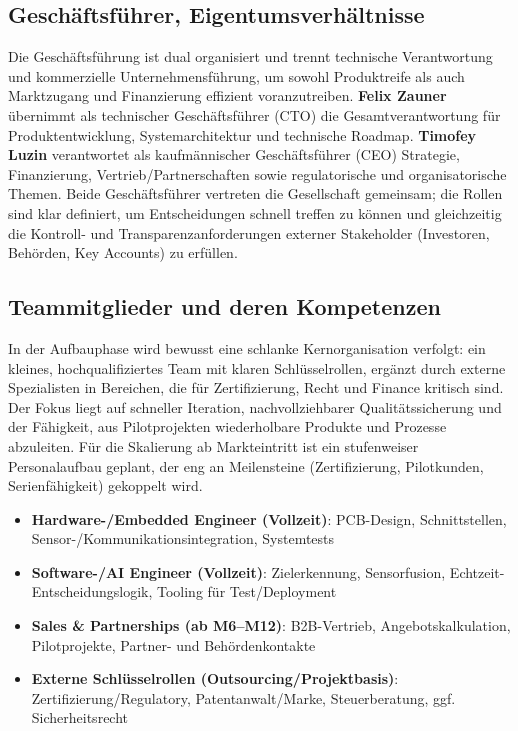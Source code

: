 \documentclass[11pt,a4paper]{article}
\begin{document}
\subsection{Geschäftsführer, Eigentumsverhältnisse}
Die Geschäftsführung ist dual organisiert und trennt technische Verantwortung und kommerzielle Unternehmensführung, um sowohl Produktreife als auch Marktzugang und Finanzierung effizient voranzutreiben. \textbf{Felix Zauner} übernimmt als technischer Geschäftsführer (CTO) die Gesamtverantwortung für Produktentwicklung, Systemarchitektur und technische Roadmap. \textbf{Timofey Luzin} verantwortet als kaufmännischer Geschäftsführer (CEO) Strategie, Finanzierung, Vertrieb/Partnerschaften sowie regulatorische und organisatorische Themen. Beide Geschäftsführer vertreten die Gesellschaft gemeinsam; die Rollen sind klar definiert, um Entscheidungen schnell treffen zu können und gleichzeitig die Kontroll- und Transparenzanforderungen externer Stakeholder (Investoren, Behörden, Key Accounts) zu erfüllen.

\subsection{Teammitglieder und deren Kompetenzen}
In der Aufbauphase wird bewusst eine schlanke Kernorganisation verfolgt: ein kleines, hochqualifiziertes Team mit klaren Schlüsselrollen, ergänzt durch externe Spezialisten in Bereichen, die für Zertifizierung, Recht und Finance kritisch sind. Der Fokus liegt auf schneller Iteration, nachvollziehbarer Qualitätssicherung und der Fähigkeit, aus Pilotprojekten wiederholbare Produkte und Prozesse abzuleiten. Für die Skalierung ab Markteintritt ist ein stufenweiser Personalaufbau geplant, der eng an Meilensteine (Zertifizierung, Pilotkunden, Serienfähigkeit) gekoppelt wird.

\begin{itemize}
  \item \textbf{Hardware-/Embedded Engineer (Vollzeit)}: PCB-Design, Schnittstellen,\\ Sensor-/Kommunikationsintegration, Systemtests
  \item \textbf{Software-/AI Engineer (Vollzeit)}: Zielerkennung, Sensorfusion, Echtzeit-Entscheidungslogik, Tooling für Test/Deployment
  \item \textbf{Sales \& Partnerships (ab M6--M12)}: B2B-Vertrieb, Angebotskalkulation, Pilotprojekte, Partner- und Behördenkontakte
  \item \textbf{Externe Schlüsselrollen (Outsourcing/Projektbasis)}: Zertifizierung/Regulatory, Patentanwalt/Marke, Steuerberatung, ggf. Sicherheitsrecht
\end{itemize}
\end{document}
